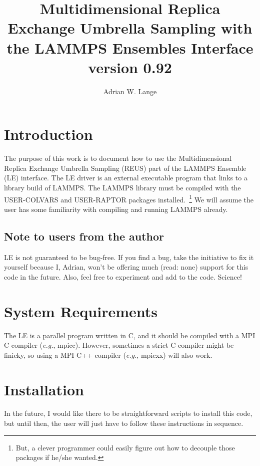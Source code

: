 \documentclass[10pt]{article}
\title{Multidimensional Replica Exchange Umbrella Sampling with the LAMMPS Ensembles Interface\\
\large version 0.92
}
\author{Adrian W. Lange}
\begin{document}
\maketitle

\section{Introduction}

The purpose of this work is to document how to use the Multidimensional Replica Exchange Umbrella
Sampling (REUS) part of the LAMMPS Ensemble (LE) interface. The LE driver
is an external executable program that links to a library build of LAMMPS. 
The LAMMPS library must be compiled with the 
USER-COLVARS and USER-RAPTOR packages 
installed.~\footnote{But, a clever programmer could easily figure out how to decouple those packages if he/she wanted.}
We will assume the user has some familiarity with compiling and running LAMMPS already. 

\subsection{Note to users from the author}

LE is not guaranteed to be bug-free. If you find a bug, take the initiative to fix it yourself because
I, Adrian, won't be offering much (read: none) support for this code in the future. Also,
feel free to experiment and add to the code. Science!

\section{System Requirements}

The LE is a parallel program written in C, and it should be compiled
with a MPI C compiler ({\em e.g.}, mpicc). However, sometimes a strict C compiler might be finicky,
so using a MPI C++ compiler ({\em e.g.}, mpicxx) will also work.

\section{Installation}

In the future, I would like there to be straightforward scripts to install this code,
but until then, the user will just have to follow these instructions in sequence. 
\end{document}
